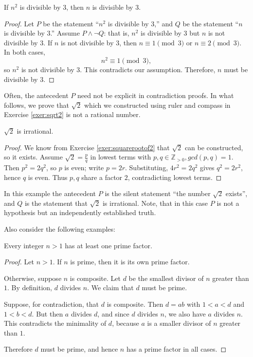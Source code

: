 \begin{theorem}
If $n^2$ is divisible by 3, then $n$ is divisible by 3.
\end{theorem}

\begin{proof}
Let $P$ be the statement ``$n^2$ is divisible by 3,'' and $Q$ be the statement ``$n$ is divisible by 3.''  
Assume $P \land \neg Q$: that is, $n^2$ is divisible by 3 but $n$ is not divisible by 3.  
If $n$ is not divisible by 3, then $n \equiv 1 \pmod{3}$ or $n \equiv 2 \pmod{3}$.  
In both cases,
\[
n^2 \equiv 1 \pmod{3},
\]
so $n^2$ is not divisible by 3. This contradicts our assumption.  
Therefore, $n$ must be divisible by 3.
\end{proof}

Often, the antecedent $P$ need not be explicit in contradiction proofs.  In what follows, we prove that $\sqrt{2}$ which we constructed using ruler and compass in Exercise \ref{exer:sqrt2} is not a rational number.

\begin{theorem}\label{thm:sqrt2}
\(\sqrt{2}\) is irrational.
\end{theorem}
\begin{proof}
We know from Exercise  \ref{exer:squarerootof2} that $\sqrt{2}$ can be constructed, so it exists. Assume \(\sqrt{2}=\frac{p}{q}\) in lowest terms with \(p,q\in\mathbb{Z}_{>0}, gcd(p,q) = 1\). Then \(p^2=2q^2\), so \(p\) is even; write \(p=2r\). Substituting, \(4r^2=2q^2\) gives \(q^2=2r^2\), hence \(q\) is even. Thus \(p,q\) share a factor \(2\), contradicting lowest terms.
\end{proof}

In this example the  antecedent $P$ is the silent statement ``the number $\sqrt{2}$ exists'', and $Q$ is the statement that \(\sqrt{2}\) is irrational. Note, that in this case $P$ is not a hypothesis but an independently 
established truth.

Also consider the following  examples:

\begin{theorem}
Every integer $n>1$ has at least one prime factor.
\end{theorem}

\begin{proof}
Let $n>1$. If $n$ is prime, then it is its own prime factor. 

Otherwise, suppose $n$ is composite. Let $d$ be the smallest divisor of $n$ greater than $1$. 
By definition, $d$ divides $n$. We claim that $d$ must be prime. 

Suppose, for contradiction, that $d$ is composite. Then $d=ab$ with $1<a<d$ and $1<b<d$. 
But then $a$ divides $d$, and since $d$ divides $n$, we also have $a$ divides $n$. 
This contradicts the minimality of $d$, because $a$ is a smaller divisor of $n$ greater than $1$. 

Therefore $d$ must be prime, and hence $n$ has a prime factor in all cases.
\end{proof}

